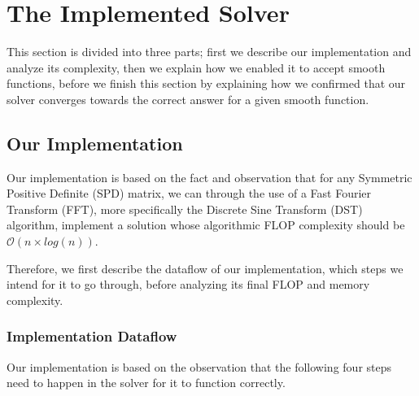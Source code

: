 \documentclass[fontsize=11pt,paper=a4,titlepage]{article}
\begin{document}
\section{The Implemented Solver}

This section is divided into three parts; first we describe our implementation
and analyze its complexity, then we explain how we enabled it to accept smooth
functions, before we finish this section by explaining how we confirmed that our
solver converges towards the correct answer for a given smooth function.

\subsection{Our Implementation}
\label{sec:Impl}

Our implementation is based on the fact and observation that for any Symmetric
Positive Definite (SPD) matrix, we can through the use of a Fast Fourier
Transform (FFT), more specifically the Discrete Sine Transform (DST)
algorithm, implement a solution whose algorithmic FLOP complexity should be
$\mathcal{O}(n\times log(n))$.

Therefore, we first describe the dataflow of our implementation, which steps we
intend for it to go through, before analyzing its final FLOP and memory
complexity.

\subsubsection{Implementation Dataflow}

Our implementation is based on the observation that the following four steps
need to happen in the solver for it to function correctly.
\end{document}
